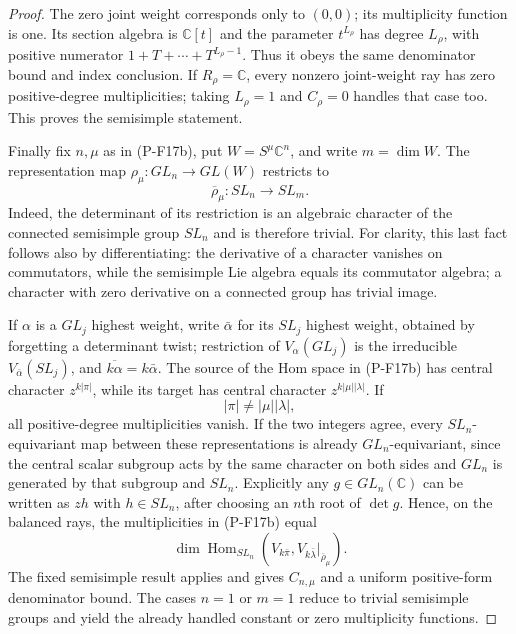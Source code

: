 \documentclass[11pt,a4paper]{article}
\begin{document}
\begin{proof}
The zero joint weight corresponds only to $(0,0)$; its multiplicity
function is one. Its section algebra is $\mathbb C[t]$ and the
parameter $t^{L_\rho}$ has degree $L_\rho$, with positive numerator
$1+T+\cdots+T^{L_\rho-1}$. Thus it obeys the same denominator
bound and index conclusion. If $R_\rho=\mathbb C$, every nonzero
joint-weight ray has zero positive-degree multiplicities; taking
$L_\rho=1$ and $C_\rho=0$ handles that case too. This proves
the semisimple statement.

Finally fix $n,\mu$ as in (P-F17b), put
$W=S^\mu\mathbb C^n$, and write $m=\dim W$.
The representation map $\rho_\mu:GL_n\to GL(W)$ restricts to
\[
 \overline\rho_\mu:SL_n\longrightarrow SL_m.
\]
Indeed, the determinant of its restriction is an algebraic character
of the connected semisimple group $SL_n$ and is therefore trivial.
For clarity, this last fact follows also by differentiating: the
derivative of a character vanishes on commutators, while the
semisimple Lie algebra equals its commutator algebra; a character
with zero derivative on a connected group has trivial image.

If $\alpha$ is a $GL_j$ highest weight, write $\bar\alpha$ for its
$SL_j$ highest weight, obtained by forgetting a determinant twist;
restriction of $V_\alpha(GL_j)$ is the irreducible
$V_{\bar\alpha}(SL_j)$, and $\overline{k\alpha}=k\bar\alpha$.
The source of the Hom space in (P-F17b) has central character
$z^{k|\pi|}$, while its target has central character
$z^{k|\mu||\lambda|}$. If
\[
 |\pi|\ne|\mu||\lambda|,
 \tag{P-F17f}
\]
all positive-degree multiplicities vanish. If the two integers agree,
every $SL_n$-equivariant map between these representations is already
$GL_n$-equivariant, since the central scalar subgroup acts by the
same character on both sides and $GL_n$ is generated by that subgroup
and $SL_n$. Explicitly any $g\in GL_n(\mathbb C)$ can be written
as $zh$ with $h\in SL_n$, after choosing an $n$th root of $\det g$.
Hence, on the balanced rays, the multiplicities in (P-F17b) equal
\[
 \dim\operatorname{Hom}_{SL_n}
     (V_{k\bar\pi},V_{k\bar\lambda}|_{\overline\rho_\mu}).
\]
The fixed semisimple result applies and gives $C_{n,\mu}$ and a
uniform positive-form denominator bound. The cases $n=1$ or $m=1$
reduce to trivial semisimple groups and yield the already handled
constant or zero multiplicity functions.


\end{proof}
\end{document}
